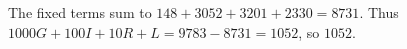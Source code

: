The fixed terms sum to $148+3052+3201+2330=8731$. Thus $1000G+100I+10R+L=9783-8731=1052$, so $\boxed{1052}$.
